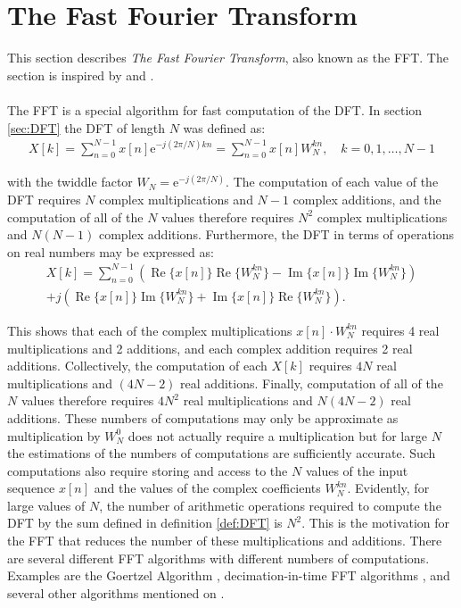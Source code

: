 \section{The Fast Fourier Transform} \label{sec:FFT}
This section describes \textit{The Fast Fourier Transform}, also known as the FFT. The section is inspired by \cite{pages 750, 755-763, DTSP} and \cite{page 303, FSP}.
\\ \\
The FFT is a special algorithm for fast computation of the DFT. In section \ref{sec:DFT} the DFT of length $N$ was defined as:
\begin{align*}
X[k] = \sum_{n=0}^{N-1} x[n] \text{e}^{-j(2\pi/N)kn} = \sum_{n=0}^{N-1} x[n] W_N^{kn}, \quad k = 0, 1, \dots, N-1
\end{align*}

with the twiddle factor $W_N = \text{e}^{-j(2\pi/N)}$. The computation of each value of the DFT requires $N$ complex multiplications and $N-1$ complex additions, and the computation of all of the $N$ values therefore requires $N^2$ complex multiplications and $N(N-1)$ complex additions. Furthermore, the DFT in terms of operations on real numbers may be expressed as:
\begin{align*}
X[k] = \sum_{n=0}^{N-1} \left( \operatorname{Re}\{x[n]\} \operatorname{Re} \{W_N^{kn}\} - \operatorname{Im}\{x[n]\}\operatorname{Im} \{W_N^{kn}\} \right) \\ + j \left( \operatorname{Re} \{x[n]\}\operatorname{Im} \{W_N^{kn}\} + \operatorname{Im} \{x[n]\} \operatorname{Re}\{W_N^{kn}\}\right).
\end{align*}

This shows that each of the complex multiplications $x[n] \cdot W_N^{kn}$ requires 4 real multiplications and 2 additions, and each complex addition requires 2 real additions. Collectively, the computation of each $X[k]$ requires $4N$ real multiplications and $(4N-2)$ real additions. Finally, computation of all of the $N$ values therefore requires $4N^2$ real multiplications and $N(4N-2)$ real additions. These numbers of computations may only be approximate as multiplication by $W_N^0$ does not actually require a multiplication but for large $N$ the estimations of the numbers of computations are sufficiently accurate. Such computations also require storing and access to the $N$ values of the input sequence $x[n]$ and the values of the complex coefficients $W_N^{kn}$. Evidently, for large values of $N$, the number of arithmetic operations required to compute the DFT by the sum defined in definition \ref{def:DFT} is $N^2$. This is the motivation for the FFT that reduces the number of these multiplications and additions. There are several different FFT algorithms with different numbers of computations. Examples are the Goertzel Algorithm \cite{page 751, DTSP}, decimation-in-time FFT algorithms \cite{page 755, DTSP}, and several other algorithms mentioned on \cite{pages 306-307, FSP}.

